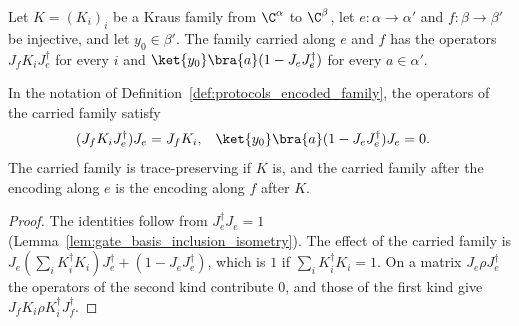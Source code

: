 \begin{definition}
    \label{def:protocols_encoded_family}
    \leanok
    Let $K=(K_i)_i$ be a Kraus family from $\C^\alpha$ to $\C^\beta$, let $e:\alpha\to\alpha'$ and
    $f:\beta\to\beta'$ be injective, and let $y_0\in\beta'$. The family carried along $e$ and
    $f$ has the operators $J_fK_iJ_e^\dagger$ for every $i$ and
    $\ket{y_0}\bra{a}(1-J_eJ_e^\dagger)$ for every $a\in\alpha'$.
\end{definition}

\begin{lemma}
    \label{lem:protocols_encoded_family}
    \leanok
    In the notation of Definition~\ref{def:protocols_encoded_family}, the operators of the
    carried family satisfy
    \begin{align}
        (J_fK_iJ_e^\dagger)J_e&=J_fK_i, &
        \ket{y_0}\bra{a}(1-J_eJ_e^\dagger)J_e&=0.
        \notag
    \end{align}
    The carried family is trace-preserving if $K$ is, and the carried family after the
    encoding along $e$ is the encoding along $f$ after $K$.
\end{lemma}
\begin{proof}\leanok
    The identities follow from $J_e^\dagger J_e=1$
    (Lemma~\ref{lem:gate_basis_inclusion_isometry}). The effect of the carried family is
    $J_e(\sum_iK_i^\dagger K_i)J_e^\dagger+(1-J_eJ_e^\dagger)$, which is $1$ if
    $\sum_iK_i^\dagger K_i=1$. On a matrix $J_e\rho J_e^\dagger$ the operators of the second
    kind contribute $0$, and those of the first kind give $J_fK_i\rho K_i^\dagger J_f^\dagger$.
\end{proof}

